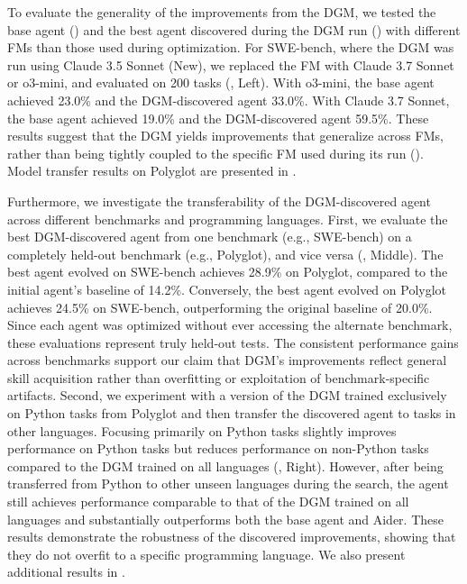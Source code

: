 \documentclass{article} %
\begin{document}
To evaluate the generality of the improvements from the DGM, we tested the base agent () and the best agent discovered during the DGM run () with different FMs than those used during optimization. For SWE-bench, where the DGM was run using Claude 3.5 Sonnet (New), we replaced the FM with Claude 3.7 Sonnet~\citep{anthropic2025claude37} or o3-mini, and evaluated on 200 tasks (, Left). With o3-mini, the base agent achieved 23.0\% and the DGM-discovered agent 33.0\%. With Claude 3.7 Sonnet, the base agent achieved 19.0\% and the DGM-discovered agent 59.5\%. These results suggest that the DGM yields improvements that generalize across FMs, rather than being tightly coupled to the specific FM used during its run (). Model transfer results on Polyglot are presented in .

Furthermore, we investigate the transferability of the DGM-discovered agent across different benchmarks and programming languages. First, we evaluate the best DGM-discovered agent from one benchmark (e.g., SWE-bench) on a completely held-out benchmark (e.g., Polyglot), and vice versa (, Middle). The best agent evolved on SWE-bench achieves 28.9\% on Polyglot, compared to the initial agent's baseline of 14.2\%. Conversely, the best agent evolved on Polyglot achieves 24.5\% on SWE-bench, outperforming the original baseline of 20.0\%. Since each agent was optimized without ever accessing the alternate benchmark, these evaluations represent truly held-out tests. The consistent performance gains across benchmarks support our claim that DGM's improvements reflect general skill acquisition rather than overfitting or exploitation of benchmark-specific artifacts. Second, we experiment with a version of the DGM trained exclusively on Python tasks from Polyglot and then transfer the discovered agent to tasks in other languages. Focusing primarily on Python tasks slightly improves performance on Python tasks but reduces performance on non-Python tasks compared to the DGM trained on all languages (, Right). However, after being transferred from Python to other unseen languages during the search, the agent still achieves performance comparable to that of the DGM trained on all languages and substantially outperforms both the base agent and Aider. These results demonstrate the robustness of the discovered improvements, showing that they do not overfit to a specific programming language. We also present additional results in .
\end{document}
